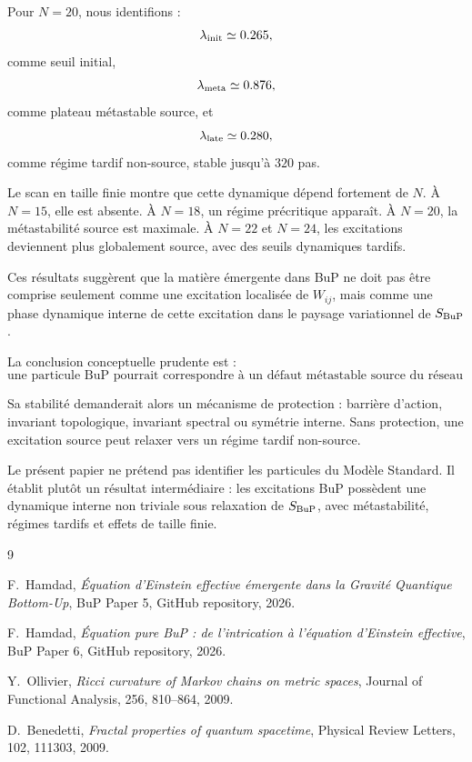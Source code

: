 \documentclass[11pt,a4paper]{article}
\begin{document}
Pour \(N=20\), nous identifions :
\[
\lambda_{\rm init}\simeq0.265,
\]
comme seuil initial,
\[
\lambda_{\rm meta}\simeq0.876,
\]
comme plateau métastable source,
et
\[
\lambda_{\rm late}\simeq0.280,
\]
comme régime tardif non-source, stable jusqu'à \(320\) pas.

Le scan en taille finie montre que cette dynamique dépend fortement de \(N\).
À \(N=15\), elle est absente. À \(N=18\), un régime précritique apparaît. À
\(N=20\), la métastabilité source est maximale. À \(N=22\) et \(N=24\),
les excitations deviennent plus globalement source, avec des seuils
dynamiques tardifs.

Ces résultats suggèrent que la matière émergente dans BuP ne doit pas être
comprise seulement comme une excitation localisée de \(W_{ij}\), mais comme une
phase dynamique interne de cette excitation dans le paysage variationnel de
\(S_{\rm BuP}\).

La conclusion conceptuelle prudente est :
\[
\boxed{
\text{une particule BuP pourrait correspondre à un défaut métastable source du réseau d'intrication.}
}
\]

Sa stabilité demanderait alors un mécanisme de protection : barrière d'action,
invariant topologique, invariant spectral ou symétrie interne. Sans protection,
une excitation source peut relaxer vers un régime tardif non-source.

Le présent papier ne prétend pas identifier les particules du Modèle Standard.
Il établit plutôt un résultat intermédiaire : les excitations BuP possèdent une
dynamique interne non triviale sous relaxation de \(S_{\rm BuP}\), avec
métastabilité, régimes tardifs et effets de taille finie.

\begin{thebibliography}{9}

F.~Hamdad,
\textit{Équation d'Einstein effective émergente dans la Gravité Quantique Bottom-Up},
BuP Paper 5, GitHub repository, 2026.

F.~Hamdad,
\textit{Équation pure BuP : de l'intrication à l'équation d'Einstein effective},
BuP Paper 6, GitHub repository, 2026.

Y.~Ollivier,
\textit{Ricci curvature of Markov chains on metric spaces},
Journal of Functional Analysis, 256, 810--864, 2009.

D.~Benedetti,
\textit{Fractal properties of quantum spacetime},
Physical Review Letters, 102, 111303, 2009.

\end{thebibliography}
\end{document}
